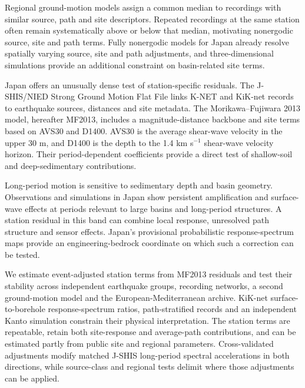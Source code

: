 \documentclass[11pt]{article}
\begin{document}
Regional ground-motion models assign a common median to recordings with similar source, path and site descriptors. Repeated recordings at the same station often remain systematically above or below that median, motivating nonergodic source, site and path terms\cite{anderson1999,stewart2017,lavrentiadis2023,kuehn2019,kuehn2023}. Fully nonergodic models for Japan already resolve spatially varying source, site and path adjustments, and three-dimensional simulations provide an additional constraint on basin-related site terms\cite{sung2024,sung2025}.

Japan offers an unusually dense test of station-specific residuals. The J-SHIS/NIED Strong Ground Motion Flat File links K-NET and KiK-net records to earthquake sources, distances and site metadata\cite{niedflatfile,morikawa2024flatfile,kinoshita1998,aoi2004,aoi2020}. The Morikawa--Fujiwara 2013 model, hereafter MF2013, includes a magnitude-distance backbone and site terms based on AVS30 and D1400\cite{morikawa2013,morikawa2023}. AVS30 is the average shear-wave velocity in the upper 30 m, and D1400 is the depth to the 1.4 km s$^{-1}$ shear-wave velocity horizon. Their period-dependent coefficients provide a direct test of shallow-soil and deep-sedimentary contributions.

Long-period motion is sensitive to sedimentary depth and basin geometry. Observations and simulations in Japan show persistent amplification and surface-wave effects at periods relevant to large basins and long-period structures\cite{koketsu2008,yoshimoto2014,takemura2015,furumura2007}. A station residual in this band can combine local response, unresolved path structure and sensor effects. Japan's provisional probabilistic response-spectrum maps provide an engineering-bedrock coordinate on which such a correction can be tested\cite{dohi2024}.

We estimate event-adjusted station terms from MF2013 residuals and test their stability across independent earthquake groups, recording networks, a second ground-motion model and the European-Mediterranean archive\cite{esm2026}. KiK-net surface-to-borehole response-spectrum ratios, path-stratified records and an independent Kanto simulation constrain their physical interpretation\cite{sung2025}. The station terms are repeatable, retain both site-response and average-path contributions, and can be estimated partly from public site and regional parameters. Cross-validated adjustments modify matched J-SHIS long-period spectral accelerations in both directions, while source-class and regional tests delimit where those adjustments can be applied.
\end{document}
